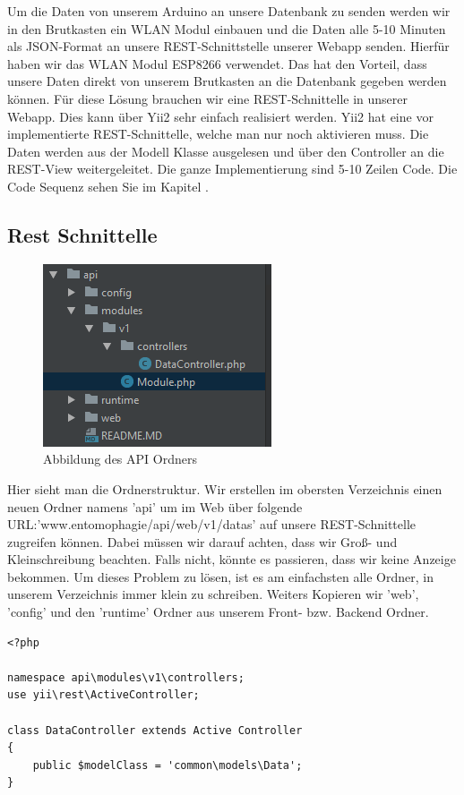 Um die Daten von unserem Arduino an unsere Datenbank zu senden werden wir in den Brutkasten ein WLAN Modul einbauen und die Daten alle 5-10 Minuten als JSON-Format an unsere REST-Schnittstelle unserer Webapp senden. Hierfür haben wir das WLAN Modul ESP8266 verwendet. Das hat den Vorteil, dass unsere Daten direkt von unserem Brutkasten an die Datenbank gegeben werden können.
\newline                                                     Für diese Lösung brauchen wir eine REST-Schnittelle in unserer Webapp. Dies kann über Yii2 sehr einfach realisiert werden. Yii2 hat eine vor implementierte REST-Schnittelle, welche man nur noch aktivieren muss. Die Daten werden aus der Modell Klasse ausgelesen und über den Controller an die REST-View weitergeleitet. Die ganze Implementierung sind 5-10 Zeilen Code. Die Code Sequenz sehen Sie im Kapitel .

\subsection{Rest Schnittelle} \label{sec:Rest}
\begin{figure}	
\includegraphics{figures/Ordner}
\caption{Abbildung des API Ordners}
\end{figure}                                                Hier sieht man die Ordnerstruktur. Wir erstellen im obersten Verzeichnis einen neuen Ordner namens 'api' um im Web über folgende \newline URL:'www.entomophagie/api/web/v1/datas' auf unsere REST-Schnittelle zugreifen können. Dabei müssen wir darauf achten, dass wir Groß- und Kleinschreibung beachten. Falls nicht, könnte es passieren, dass wir keine Anzeige bekommen. Um dieses Problem zu lösen, ist es am einfachsten alle Ordner, in unserem Verzeichnis immer klein zu schreiben.\newline
Weiters Kopieren wir 'web', 'config' und den 'runtime' Ordner aus unserem Front- bzw. Backend Ordner. 
\begin{lstlisting}[caption=Controller Klasse für REST]
<?php

namespace api\modules\v1\controllers;
use yii\rest\ActiveController;

class DataController extends Active Controller
{
	public $modelClass = 'common\models\Data';
}
\end{lstlisting}


